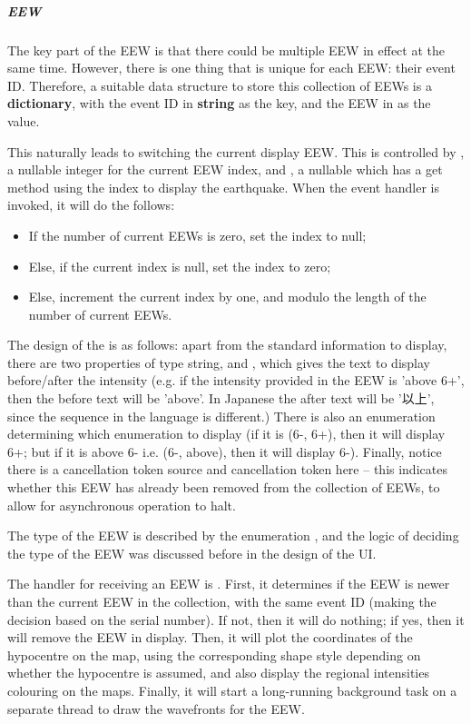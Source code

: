 \subparagraph{EEW}

The key part of the EEW is that there could be multiple EEW in effect at the same time. However, there is one thing that is unique for each EEW: their event ID. Therefore, a suitable data structure to store this collection of EEWs is a \textbf{dictionary}, with the event ID in \textbf{string} as the key, and the EEW in  as the value.

This naturally leads to switching the current display EEW. This is controlled by , a nullable integer for the current EEW index, and , a nullable  which has a get method using the index to display the earthquake. When the  event handler is invoked, it will do the follows:
\begin{itemize}
    \item If the number of current EEWs is zero, set the index to null;
    \item Else, if the current index is null, set the index to zero;
    \item Else, increment the current index by one, and modulo the length of the number of current EEWs.
\end{itemize}

The design of the  is as follows: apart from the standard information to display, there are two properties of type string,  and , which gives the text to display before/after the intensity (e.g. if the intensity provided in the EEW is 'above 6+', then the before text will be 'above'. In Japanese the after text will be '以上', since the sequence in the language is different.) There is also an enumeration determining which enumeration to display (if it is (6-, 6+), then it will display 6+; but if it is above 6- i.e. (6-, above), then it will display 6-). Finally, notice there is a cancellation token source and cancellation token here -- this indicates whether this EEW has already been removed from the collection of EEWs, to allow for asynchronous operation to halt.

The type of the EEW is described by the enumeration , and the logic of deciding the type of the EEW was discussed before in the design of the UI.

The handler for receiving an EEW is . First, it determines if the EEW is newer than the current EEW in the collection, with the same event ID (making the decision based on the serial number). If not, then it will do nothing; if yes, then it will remove the EEW in display. Then, it will plot the coordinates of the hypocentre on the map, using the corresponding shape style depending on whether the hypocentre is assumed, and also display the regional intensities colouring on the maps.  Finally, it will start a long-running background task on a separate thread to draw the wavefronts for the EEW.

